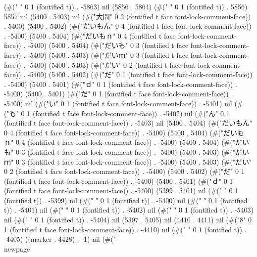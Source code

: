 (#(" " 0 1 (fontified t)) . -5863) nil (5856 . 5864) (#(" " 0 1 (fontified t)) . 5856) 5857 nil (5400 . 5403) nil (#("大問" 0 2 (fontified t face font-lock-comment-face)) . 5400) (5400 . 5402) (#("だいもん" 0 4 (fontified t face font-lock-comment-face)) . -5400) (5400 . 5404) (#("だいもｎ" 0 4 (fontified t face font-lock-comment-face)) . -5400) (5400 . 5404) (#("だいも" 0 3 (fontified t face font-lock-comment-face)) . -5400) (5400 . 5403) (#("だいｍ" 0 3 (fontified t face font-lock-comment-face)) . -5400) (5400 . 5403) (#("だい" 0 2 (fontified t face font-lock-comment-face)) . -5400) (5400 . 5402) (#("だ" 0 1 (fontified t face font-lock-comment-face)) . -5400) (5400 . 5401) (#("ｄ" 0 1 (fontified t face font-lock-comment-face)) . -5400) (5400 . 5401) (#("だ" 0 1 (fontified t face font-lock-comment-face)) . -5400) nil (#("い" 0 1 (fontified t face font-lock-comment-face)) . -5401) nil (#("も" 0 1 (fontified t face font-lock-comment-face)) . -5402) nil (#("ん" 0 1 (fontified t face font-lock-comment-face)) . -5403) nil (5400 . 5404) (#("だいもん" 0 4 (fontified t face font-lock-comment-face)) . -5400) (5400 . 5404) (#("だいもｎ" 0 4 (fontified t face font-lock-comment-face)) . -5400) (5400 . 5404) (#("だいも" 0 3 (fontified t face font-lock-comment-face)) . -5400) (5400 . 5403) (#("だいｍ" 0 3 (fontified t face font-lock-comment-face)) . -5400) (5400 . 5403) (#("だい" 0 2 (fontified t face font-lock-comment-face)) . -5400) (5400 . 5402) (#("だ" 0 1 (fontified t face font-lock-comment-face)) . -5400) (5400 . 5401) (#("ｄ" 0 1 (fontified t face font-lock-comment-face)) . -5400) (5399 . 5401) nil (#(" " 0 1 (fontified t)) . -5399) nil (#(" " 0 1 (fontified t)) . -5400) nil (#(" " 0 1 (fontified t)) . -5401) nil (#(" " 0 1 (fontified t)) . -5402) nil (#(" " 0 1 (fontified t)) . -5403) nil (#(" " 0 1 (fontified t)) . -5404) nil (5397 . 5405) nil (4410 . 4411) nil (#("8" 0 1 (fontified t face font-lock-comment-face)) . -4410) nil (#("
" 0 1 (fontified t)) . -4405) ((marker . 4428) . -1) nil (#("\\newpage

